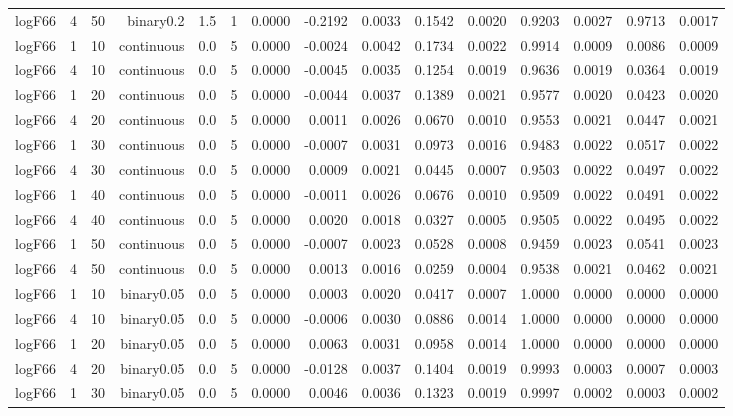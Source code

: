 \begin{longtable}{rrrrrrrrrrrrrrr}
  logF66 & 4 & 50 & binary0.2 & 1.5 & 1 & 0.0000 & -0.2192 & 0.0033 & 0.1542 & 0.0020 & 0.9203 & 0.0027 & 0.9713 & 0.0017 \\ 
  logF66 & 1 & 10 & continuous & 0.0 & 5 & 0.0000 & -0.0024 & 0.0042 & 0.1734 & 0.0022 & 0.9914 & 0.0009 & 0.0086 & 0.0009 \\ 
  logF66 & 4 & 10 & continuous & 0.0 & 5 & 0.0000 & -0.0045 & 0.0035 & 0.1254 & 0.0019 & 0.9636 & 0.0019 & 0.0364 & 0.0019 \\ 
  logF66 & 1 & 20 & continuous & 0.0 & 5 & 0.0000 & -0.0044 & 0.0037 & 0.1389 & 0.0021 & 0.9577 & 0.0020 & 0.0423 & 0.0020 \\ 
  logF66 & 4 & 20 & continuous & 0.0 & 5 & 0.0000 & 0.0011 & 0.0026 & 0.0670 & 0.0010 & 0.9553 & 0.0021 & 0.0447 & 0.0021 \\ 
  logF66 & 1 & 30 & continuous & 0.0 & 5 & 0.0000 & -0.0007 & 0.0031 & 0.0973 & 0.0016 & 0.9483 & 0.0022 & 0.0517 & 0.0022 \\ 
  logF66 & 4 & 30 & continuous & 0.0 & 5 & 0.0000 & 0.0009 & 0.0021 & 0.0445 & 0.0007 & 0.9503 & 0.0022 & 0.0497 & 0.0022 \\ 
  logF66 & 1 & 40 & continuous & 0.0 & 5 & 0.0000 & -0.0011 & 0.0026 & 0.0676 & 0.0010 & 0.9509 & 0.0022 & 0.0491 & 0.0022 \\ 
  logF66 & 4 & 40 & continuous & 0.0 & 5 & 0.0000 & 0.0020 & 0.0018 & 0.0327 & 0.0005 & 0.9505 & 0.0022 & 0.0495 & 0.0022 \\ 
  logF66 & 1 & 50 & continuous & 0.0 & 5 & 0.0000 & -0.0007 & 0.0023 & 0.0528 & 0.0008 & 0.9459 & 0.0023 & 0.0541 & 0.0023 \\ 
  logF66 & 4 & 50 & continuous & 0.0 & 5 & 0.0000 & 0.0013 & 0.0016 & 0.0259 & 0.0004 & 0.9538 & 0.0021 & 0.0462 & 0.0021 \\ 
  logF66 & 1 & 10 & binary0.05 & 0.0 & 5 & 0.0000 & 0.0003 & 0.0020 & 0.0417 & 0.0007 & 1.0000 & 0.0000 & 0.0000 & 0.0000 \\ 
  logF66 & 4 & 10 & binary0.05 & 0.0 & 5 & 0.0000 & -0.0006 & 0.0030 & 0.0886 & 0.0014 & 1.0000 & 0.0000 & 0.0000 & 0.0000 \\ 
  logF66 & 1 & 20 & binary0.05 & 0.0 & 5 & 0.0000 & 0.0063 & 0.0031 & 0.0958 & 0.0014 & 1.0000 & 0.0000 & 0.0000 & 0.0000 \\ 
  logF66 & 4 & 20 & binary0.05 & 0.0 & 5 & 0.0000 & -0.0128 & 0.0037 & 0.1404 & 0.0019 & 0.9993 & 0.0003 & 0.0007 & 0.0003 \\ 
  logF66 & 1 & 30 & binary0.05 & 0.0 & 5 & 0.0000 & 0.0046 & 0.0036 & 0.1323 & 0.0019 & 0.9997 & 0.0002 & 0.0003 & 0.0002 \\ 

\end{longtable}
